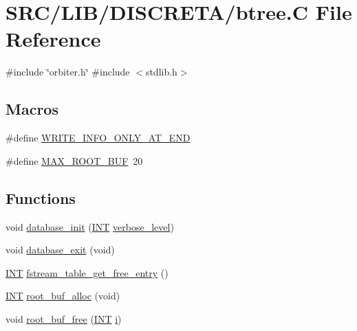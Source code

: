 \hypertarget{btree_8_c}{}\section{S\+R\+C/\+L\+I\+B/\+D\+I\+S\+C\+R\+E\+T\+A/btree.C File Reference}
\label{btree_8_c}
{\ttfamily \#include \char`\"{}orbiter.\+h\char`\"{}}\newline
{\ttfamily \#include $<$stdlib.\+h$>$}\newline
\subsection*{Macros}
\begin{DoxyCompactItemize}
\item 
\#define \mbox{\hyperlink{btree_8_c_a7ef6ef015fbf83df3a2c4648844b5cda}{W\+R\+I\+T\+E\+\_\+\+I\+N\+F\+O\+\_\+\+O\+N\+L\+Y\+\_\+\+A\+T\+\_\+\+E\+ND}}
\item 
\#define \mbox{\hyperlink{btree_8_c_a123ee60d971b70c612e19242dab45322}{M\+A\+X\+\_\+\+R\+O\+O\+T\+\_\+\+B\+UF}}~20
\end{DoxyCompactItemize}
\subsection*{Functions}
\begin{DoxyCompactItemize}
\item 
void \mbox{\hyperlink{btree_8_c_a925ec7a8df95c484c506e7d1a0419f1c}{database\+\_\+init}} (\mbox{\hyperlink{galois_8h_a09fddde158a3a20bd2dcadb609de11dc}{I\+NT}} \mbox{\hyperlink{simeon_8_c_a818073fbcc2f439e7c56952f67386122}{verbose\+\_\+level}})
\item 
void \mbox{\hyperlink{btree_8_c_a148ac0b1862e734a075726e1b266d4cb}{database\+\_\+exit}} (void)
\item 
\mbox{\hyperlink{galois_8h_a09fddde158a3a20bd2dcadb609de11dc}{I\+NT}} \mbox{\hyperlink{btree_8_c_abcbcbf20417d165bbdd434e9457d7d56}{fstream\+\_\+table\+\_\+get\+\_\+free\+\_\+entry}} ()
\item 
\mbox{\hyperlink{galois_8h_a09fddde158a3a20bd2dcadb609de11dc}{I\+NT}} \mbox{\hyperlink{btree_8_c_adaf8ad4d29fb934114aac1785476c237}{root\+\_\+buf\+\_\+alloc}} (void)
\item 
void \mbox{\hyperlink{btree_8_c_af27aebe6706c704b92c1e0eb6c3f7a20}{root\+\_\+buf\+\_\+free}} (\mbox{\hyperlink{galois_8h_a09fddde158a3a20bd2dcadb609de11dc}{I\+NT}} \mbox{\hyperlink{alphabet2_8_c_acb559820d9ca11295b4500f179ef6392}{i}})
\end{DoxyCompactItemize}
